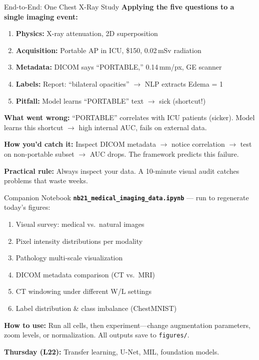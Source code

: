 \documentclass[aspectratio=169,10pt]{beamer}
\begin{document}
\begin{frame}{End-to-End: One Chest X-Ray Study}
\textbf{Applying the five questions to a single imaging event:}

\vspace{0.2em}
\begin{enumerate}
    \item \textbf{Physics:} X-ray attenuation, 2D superposition
    \item \textbf{Acquisition:} Portable AP in ICU, \$150, 0.02\,mSv radiation
    \item \textbf{Metadata:} DICOM says ``PORTABLE,'' 0.14\,mm/px, GE scanner
    \item \textbf{Labels:} Report: ``bilateral opacities'' $\to$ NLP extracts Edema = 1
    \item \textbf{Pitfall:} Model learns ``PORTABLE'' text $\to$ sick (shortcut!)
\end{enumerate}

\vspace{0.3em}
\pause
\textbf{What went wrong:} ``PORTABLE'' correlates with ICU patients (sicker). Model learns this shortcut $\to$ high internal AUC, fails on external data.

\vspace{0.2em}
\textbf{How you'd catch it:} Inspect DICOM metadata $\to$ notice correlation $\to$ test on non-portable subset $\to$ AUC drops. \alert{The framework predicts this failure.}

\vspace{0.1em}
{\small \textbf{Practical rule:} Always inspect your data. A 10-minute visual audit catches problems that waste weeks.}
\end{frame}

\begin{frame}{Companion Notebook}
\textbf{\texttt{nb21\_medical\_imaging\_data.ipynb}} --- run to regenerate today's figures:
\begin{enumerate}
    \item Visual survey: medical vs.\ natural images
    \item Pixel intensity distributions per modality
    \item Pathology multi-scale visualization
    \item DICOM metadata comparison (CT vs.\ MRI)
    \item CT windowing under different W/L settings
    \item Label distribution \& class imbalance (ChestMNIST)
\end{enumerate}

\textbf{How to use:} Run all cells, then experiment---change augmentation parameters, zoom levels, or normalization. All outputs save to \texttt{figures/}.

\textbf{Thursday (L22):} Transfer learning, U-Net, \alert{MIL}, foundation models.
\end{frame}
\end{document}
